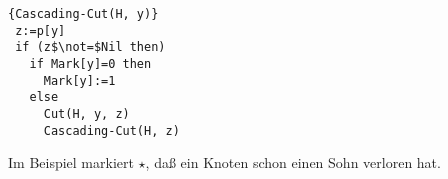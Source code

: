 \documentclass[ngerman,draft,parskip=half*,twoside]{scrreprt}
\theoremstyle{break}
\begin{document}
\begin{Algorithmus}[H]
\begin{lstlisting}[frame=tlrb, mathescape=true, title=\textsc{Cascading-Cut\textnormal{(H, y)}}, gobble=1]{Cascading-Cut(H, y)}
 z:=p[y]
 if (z$\not=$Nil then)
   if Mark[y]=0 then
     Mark[y]:=1
   else
     Cut(H, y, z)
     Cascading-Cut(H, z)  
\end{lstlisting}
\end{Algorithmus}

Im Beispiel markiert $\star$, daß ein Knoten schon einen Sohn verloren hat.
\end{document}
